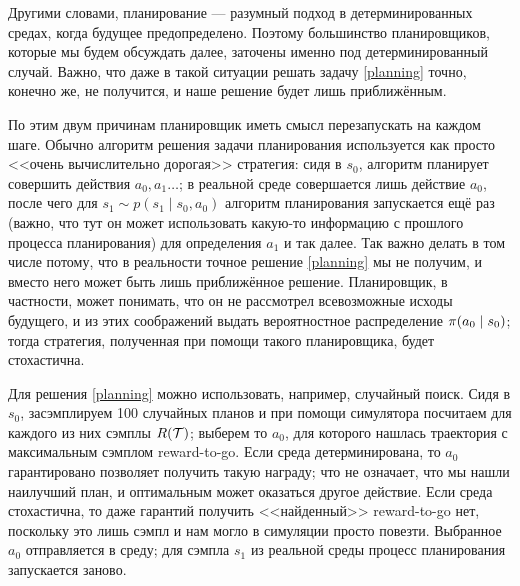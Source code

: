 Другими словами, планирование --- разумный подход в детерминированных средах, когда будущее предопределено. Поэтому большинство планировщиков, которые мы будем обсуждать далее, заточены именно под детерминированный случай. Важно, что даже в такой ситуации решать задачу \eqref{planning} точно, конечно же, не получится, и наше решение будет лишь приближённым. 

По этим двум причинам планировщик иметь смысл перезапускать на каждом шаге. Обычно алгоритм решения задачи планирования используется как просто <<очень вычислительно дорогая>> стратегия: сидя в $s_0$, алгоритм планирует совершить действия $a_0, a_1 \dots$; в реальной среде совершается лишь действие $a_0$, после чего для $s_1 \sim p(s_1 \mid s_0, a_0)$ алгоритм планирования запускается ещё раз (важно, что тут он может использовать какую-то информацию с прошлого процесса планирования) для определения $a_1$ и так далее. Так важно делать в том числе потому, что в реальности точное решение \eqref{planning} мы не получим, и вместо него может быть лишь приближённое решение. Планировщик, в частности, может понимать, что он не рассмотрел всевозможные исходы будущего, и из этих соображений выдать вероятностное распределение $\pi(a_0 \HM\mid s_0)$; тогда стратегия, полученная при помощи такого планировщика, будет стохастична.

\begin{example}
Для решения \eqref{planning} можно использовать, например, случайный поиск. Сидя в $s_0$, засэмплируем 100 случайных планов и при помощи симулятора посчитаем для каждого из них сэмплы $R(\mathcal{T})$; выберем то $a_0$, для которого нашлась траектория с максимальным сэмплом reward-to-go. Если среда детерминирована, то $a_0$ гарантировано позволяет получить такую награду; что не означает, что мы нашли наилучший план, и оптимальным может оказаться другое действие. Если среда стохастична, то даже гарантий получить <<найденный>> reward-to-go нет, поскольку это лишь сэмпл и нам могло в симуляции просто повезти. Выбранное $a_0$ отправляется в среду; для сэмпла $s_1$ из реальной среды процесс планирования запускается заново. 


\end{example}

